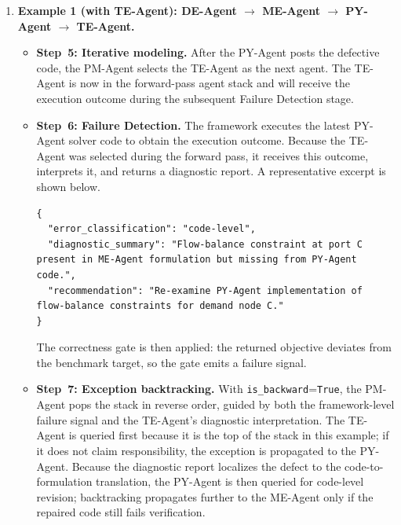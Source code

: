 \documentclass[11pt,a4paper]{article}
\begin{document}
\begin{enumerate}
\item \textbf{Example 1 (with TE-Agent): DE-Agent $\rightarrow$ ME-Agent $\rightarrow$ PY-Agent $\rightarrow$ TE-Agent.}
\begin{itemize}
\item \textbf{Step~5: Iterative modeling.} After the PY-Agent posts the defective code, the PM-Agent selects the TE-Agent as the next agent. The TE-Agent is now in the forward-pass agent stack and will receive the execution outcome during the subsequent Failure Detection stage.
\item \textbf{Step~6: Failure Detection.} The framework executes the latest PY-Agent solver code to obtain the execution outcome. Because the TE-Agent was selected during the forward pass, it receives this outcome, interprets it, and returns a diagnostic report. A representative excerpt is shown below.
\begin{promptbox}
\begin{lstlisting}[style=prompttemplate]
{
  "error_classification": "code-level",
  "diagnostic_summary": "Flow-balance constraint at port C present in ME-Agent formulation but missing from PY-Agent code.",
  "recommendation": "Re-examine PY-Agent implementation of flow-balance constraints for demand node C."
}
\end{lstlisting}
\end{promptbox}
The correctness gate is then applied: the returned objective deviates from the benchmark target, so the gate emits a failure signal.
\item \textbf{Step~7: Exception backtracking.} With \texttt{is\_backward}=\texttt{True}, the PM-Agent pops the stack in reverse order, guided by both the framework-level failure signal and the TE-Agent's diagnostic interpretation. The TE-Agent is queried first because it is the top of the stack in this example; if it does not claim responsibility, the exception is propagated to the PY-Agent. Because the diagnostic report localizes the defect to the code-to-formulation translation, the PY-Agent is then queried for code-level revision; backtracking propagates further to the ME-Agent only if the repaired code still fails verification.
\end{itemize}


\end{enumerate}
\end{document}
